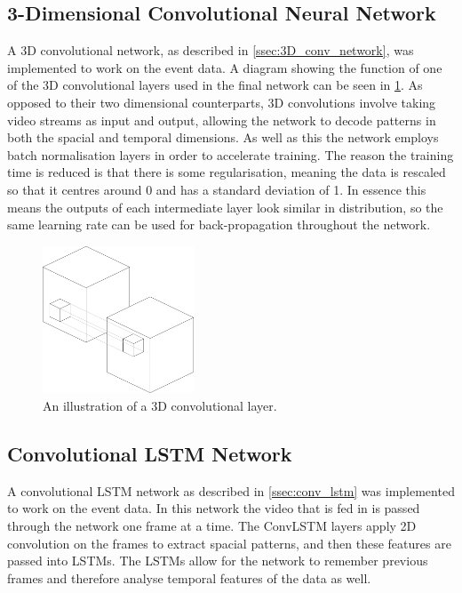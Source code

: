 \subsection{3-Dimensional Convolutional Neural Network} \label{ssec:conv_3d_network_design}

A 3D convolutional network, as described in \cref{ssec:3D_conv_network}, was implemented to work on the event data. A diagram showing the function of one of the 3D convolutional layers used in the final network can be seen in \cref{fig:conv3d_diagram}. As opposed to their two dimensional counterparts, 3D convolutions involve taking video streams as input and output, allowing the network to decode patterns in both the spacial and temporal dimensions. As well as this the network employs batch normalisation layers in order to accelerate training. The reason the training time is reduced is that there is some regularisation, meaning the data is rescaled so that it centres around 0 and has a standard deviation of 1. In essence this means the outputs of each intermediate layer look similar in distribution, so the same learning rate can be used for back-propagation throughout the network.

\begin{figure}[htb]
    \centering
    \includegraphics[width=0.4\textwidth]{analysisanddesign/images/conv3d_diagram.png}
    \caption{An illustration of a 3D convolutional layer.}
    \label{fig:conv3d_diagram}
\end{figure}

\subsection{Convolutional LSTM Network}

A convolutional LSTM network as described in \cref{ssec:conv_lstm} was implemented to work on the event data. In this network the video that is fed in is passed through the network one frame at a time. The ConvLSTM layers apply 2D convolution on the frames to extract spacial patterns, and then these features are passed into LSTMs. The LSTMs allow for the network to remember previous frames and therefore analyse temporal features of the data as well.

